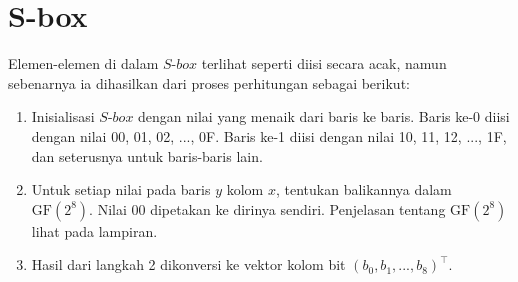 \documentclass{article}
\begin{document}

\section*{S-box}

Elemen-elemen di dalam $S\text{-}box$ terlihat seperti diisi secara acak, namun sebenarnya ia dihasilkan dari proses perhitungan sebagai berikut:

\begin{enumerate}
    \item Inisialisasi $S\text{-}box$ dengan nilai yang menaik dari baris ke baris. Baris ke-0 diisi dengan nilai 00, 01, 02, ..., 0F. Baris ke-1 diisi dengan nilai 10, 11, 12, ..., 1F, dan seterusnya untuk baris-baris lain.
    \item Untuk setiap nilai pada baris $y$ kolom $x$, tentukan balikannya dalam $\text{GF}(2^8)$. Nilai 00 dipetakan ke dirinya sendiri. Penjelasan tentang $\text{GF}(2^8)$ lihat pada lampiran.
    \item Hasil dari langkah 2 dikonversi ke vektor kolom bit $(b_0, b_1, ..., b_8)^\top$.
\end{enumerate}
\end{document}
